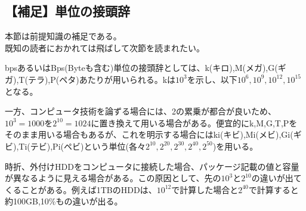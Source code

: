 \subsection{【補足】単位の接頭辞}
\begin{center}
\begin{minipage}[]{0.75\linewidth}
\begin{screen}
\begin{center}
本節は前提知識の補足である。\\
既知の読者におかれては飛ばして次節を読まれたい。
\end{center}
\end{screen}
\end{minipage}
\end{center}

bpsあるいはBps(Byteも含む)単位の接頭辞としては、k(キロ),M(メガ),G(ギガ),T(テラ),P(ペタ)あたりが用いられる。kは$10^3$を示し、以下$10^6,10^9,10^{12},10^{15}$となる。

一方、コンピュータ技術を論ずる場合には、2の累乗が都合が良いため、$10^3=1000$を$2^{10}=1024$に置き換えて用いる場合がある。便宜的にk,M,G,T,Pをそのまま用いる場合もあるが、これを明示する場合にはki(キビ),Mi(メビ),Gi(ギビ),Ti(テビ),Pi(ペビ)という単位(各々$2^{10},2^{20},2^{30},2^{40},2^{50}$)を用いる。

時折、外付けHDDをコンピュータに接続した場合、パッケージ記載の値と容量が異なるように見える場合がある。この原因として、先の$10^3$と$2^{10}$の違いが出てくることがある。例えば1TBのHDDは、$10^{12}$で計算した場合と$2^{40}$で計算すると約100GB,10\%もの違いが出る。

